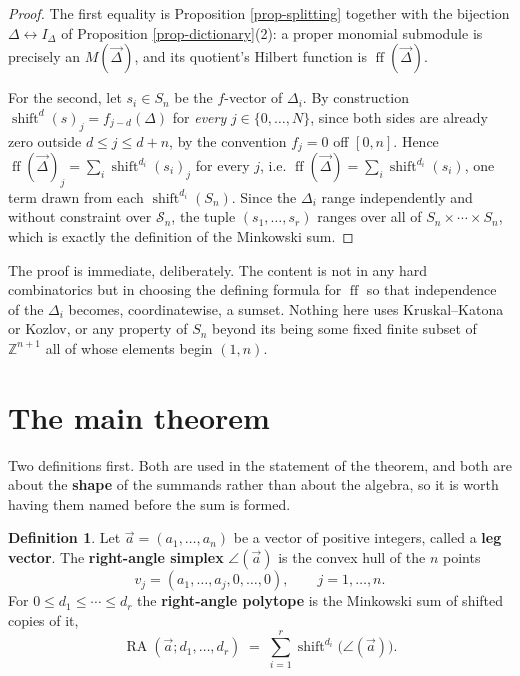 \documentclass[11pt, a4paper, abstract=yes]{scrartcl}
\theoremstyle{definition}
\newtheorem{definition}{Definition}
\theoremstyle{remark}
\theoremstyle{plain}
\newcommand{\shift}{\operatorname{shift}}
\newcommand{\rasimp}{\angle}
\newcommand{\RA}{\operatorname{RA}}
\newcommand{\ff}{\operatorname{ff}}
\begin{document}
\begin{proof}
The first equality is Proposition \ref{prop-splitting} together with the bijection
\(\Delta\leftrightarrow I_\Delta\) of Proposition \ref{prop-dictionary}(2): a proper monomial submodule is
precisely an \(M(\vec\Delta)\), and its quotient's Hilbert function is \(\ff(\vec\Delta)\).

For the second, let \(s_i\in S_n\) be the \(f\)-vector of \(\Delta_i\). By construction
\(\shift^{d}(s)_j=f_{j-d}(\Delta)\) for \emph{every} \(j\in\lbrace0,\dots,N\rbrace\), since both sides are
already zero outside \(d\le j\le d+n\), by the convention \(f_j=0\) off \([0,n]\). Hence
\(\ff(\vec\Delta)_j=\sum_i\shift^{d_i}(s_i)_j\) for every \(j\), i.e.
\(\ff(\vec\Delta)=\sum_i\shift^{d_i}(s_i)\), one term drawn from each \(\shift^{d_i}(S_n)\). Since
the \(\Delta_i\) range independently and without constraint over \(\mathcal S_n\), the tuple
\((s_1,\dots,s_r)\) ranges over all of \(S_n\times\cdots\times S_n\), which is exactly the definition
of the Minkowski sum.
\end{proof}

The proof is immediate, deliberately. The content is not in any hard combinatorics but in choosing
the defining formula for \(\ff\) so that independence of the \(\Delta_i\) becomes, coordinatewise, a
sumset. Nothing here uses Kruskal--Katona or Kozlov, or any property of \(S_n\) beyond its being some
fixed finite subset of \(\mathbb Z^{n+1}\) all of whose elements begin \((1,n)\).
\section{The main theorem}
\label{sec-main}
Two definitions first. Both are used in the statement of the theorem, and both are about the
\textbf{shape} of the summands rather than about the algebra, so it is worth having them named before the
sum is formed.

\begin{definition}
Let \(\vec a=(a_1,\dots,a_n)\) be a vector of positive integers, called a \textbf{leg vector}. The
\textbf{right-angle simplex} \(\rasimp(\vec a)\) is the convex hull of the \(n\) points
\begin{equation}\label{eq:rasimp}
  v_j=(a_1,\dots,a_j,0,\dots,0),\qquad j=1,\dots,n .
\end{equation}
For \(0\le d_1\le\cdots\le d_r\) the \textbf{right-angle polytope} is the Minkowski sum of shifted copies
of it,
\begin{equation}\label{eq:rasimp-1}
  \RA(\vec a;d_1,\dots,d_r)\;=\;\sum_{i=1}^{r}\shift^{d_i}\bigl(\rasimp(\vec a)\bigr).
\end{equation}
\label{def-rasimp}
\end{definition}
\end{document}
